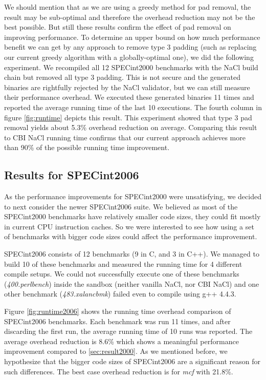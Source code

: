 \documentclass[conference]{IEEEtran}
\begin{document}
We should mention that as we are using a greedy method for pad removal, the result may be sub-optimal and therefore the overhead reduction may not be the best possible. But still these results confirm the effect of pad removal on improving performance.
To determine an upper bound on how much performance benefit we can get by any approach to remove type 3 padding (such as replacing our current greedy algorithm with a globally-optimal one), we did the following experiment. We recompiled all 12 SPECint2000 benchmarks with the NaCl build chain but removed all type 3 padding. This is not secure and the generated binaries are rightfully rejected by the NaCl validator, but we can still measure their performance overhead. We executed these generated binaries 11 times and reported the average running time of the last 10 executions. The fourth column in figure \ref{fig:runtime} depicts this result. This experiment showed that type 3 pad removal yields about 5.3\% overhead reduction on average. Comparing this result to CBI NaCl running time confirms that our current approach achieves more than 90\% of the possible running time improvement.




\subsection{Results for SPECint2006}
As the performance improvements for SPECint2000 were unsatisfying, we decided to next consider the newer SPECint2006 suite. We believed as most of the SPECint2000 benchmarks have relatively smaller code sizes, they could fit mostly in current CPU instruction caches. So we were interested to see how using a set of benchmarks with bigger code sizes could affect the performance improvement. 

SPECint2006 consists of 12 benchmarks (9 in C, and 3 in C++). We managed to build 10 of these benchmarks and measured the running time for 4 different compile setups. We could not successfully execute one of these benchmarks (\textit{400.perlbench}) inside the sandbox (neither vanilla NaCl, nor CBI NaCl) and one other benchmark (\textit{483.xalancbmk}) failed even to compile using g++ 4.4.3. 

Figure \ref{fig:runtime2006} shows the running time overhead comparison of SPECint2006 benchmarks. Each benchmark was run 11 times, and
after discarding the first run, the average running time of 10 runs was reported.
The average overhead reduction is 8.6\% which shows a 
meaningful performance improvement compared to \ref{sec:result2000}. As we mentioned before, we hypothesize that the bigger code sizes of SPECint2006 
are a significant reason for such differences. The best case overhead reduction is for \textit{mcf} with 21.8\%. 
\end{document}
